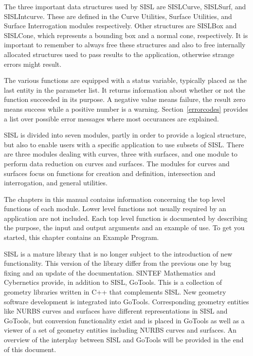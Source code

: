 The three important data structures used by SISL are SISLCurve,
SISLSurf, and SISLIntcurve. These are defined in the Curve Utilities,
Surface Utilities, and Surface Interrogation modules respectively. Other
structures are SISLBox and SISLCone, which represents a bounding box and
a normal cone, respectively. It is
important to remember to always free these structures and also to free
internally allocated structures used to pass results to the application,
otherwise strange errors might result.

The various functions are equipped with a status variable, typically
placed as the last entity in the parameter list. It returns information
about whether or not the function succeeded in its purpose. A negative
value means failure, the result zero means success while a positive
number is a warning. Section~\ref{errorcodes} provides a list over
possible error messages where most occurances are explained. 

\medskip
SISL is divided into seven modules, partly in order to provide a logical
structure, but also to enable users with a specific application to use
subsets of SISL. There are three modules dealing with curves, three with
surfaces, and one module to perform data reduction on curves and
surfaces. The modules for
curves and surfaces focus on functions for creation and definition,
intersection and interrogation, and general utilities.

The chapters in this manual contains information concerning the top
level functions of each module. Lower level functions not usually
required by an application are not included. Each top level function is
documented by describing the purpose, the input and output arguments and
an example of use. To get you started, this chapter contains an Example
Program.

\medskip
SISL is a mature library that is no longer subject to the introduction of new functionality.
This version of the library differ from the previous one by bug fixing and
an update of the documentation. SINTEF Mathematics and Cybernetics provide, in
addition to SISL, GoTools. This is a collection of geometry libraries written
in C++ that complements SISL. New geometry software development is integrated
into GoTools. Corresponding geometry entities like NURBS curves and surfaces
have different representations in SISL and GoTools, but conversion
functionality exist and is placed in GoTools as well as a viewer of a set of geometry
entities including NURBS curves and surfaces. An overview of the interplay
between SISL and GoTools will be provided in the end of this document.


